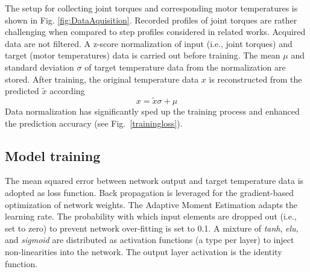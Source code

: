 \documentclass{ifacconf}
\begin{document}
The setup for collecting joint torques and corresponding motor temperatures is shown in Fig. \ref{fig:DataAquisition}. Recorded profiles of joint torques are rather challenging when compared to step profiles considered in related works.  Acquired data are not filtered. A z-score normalization of  input (i.e., joint torques) and target (motor temperatures) data is carried out before training. The  mean $\mu$ and standard deviation $\sigma$ of target temperature data from the normalization are stored. After training, the original  temperature data $x$ is reconstructed from the predicted $\tilde{x}$ according
\begin{equation}
	x=\tilde{x}\sigma +\mu
\end{equation}
Data normalization has significantly sped up the training process and enhanced the prediction accuracy (see Fig.~\ref{trainingloss}). 
\subsection{Model training}
The mean squared error between network output and target temperature data  is adopted as loss function. Back propagation is leveraged for the gradient-based optimization of network weights. The Adaptive Moment {Estimation adapts the learning rate.} The probability with which input elements are dropped out (i.e., set to zero) to prevent  network over-fitting is set to 0.1. A mixture of \textit{tanh}, \textit{elu}, and \textit{sigmoid} are distributed as activation functions (a type per layer) to inject non-linearities  into the network. The output layer activation is  {the identity  function.}
\end{document}
